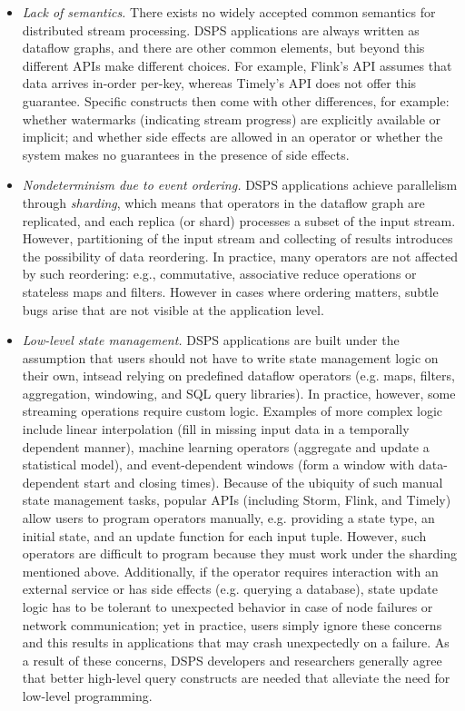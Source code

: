 \begin{itemize}
\item \emph{Lack of semantics.}
There exists no widely accepted common semantics for distributed stream processing.
DSPS applications are always written as dataflow graphs, and there are other common elements,
but beyond this different APIs make different choices.
For example, Flink's API
assumes that data arrives in-order per-key, whereas Timely's API does not offer this guarantee.
Specific constructs then come with other differences, for example: whether watermarks (indicating stream progress) are explicitly available or implicit;
and
whether side effects are allowed in an operator or whether the system makes no guarantees in the presence of side effects.

\item \emph{Nondeterminism due to event ordering.}
DSPS applications achieve parallelism through \emph{sharding}, which means that operators in the dataflow graph are replicated, and each replica (or shard) processes a subset of the input stream.
However, partitioning of the input stream and collecting of results introduces
the possibility of data reordering.
In practice, many operators are not affected by such reordering: e.g.,
commutative, associative reduce operations or stateless maps and filters.
However in cases where ordering matters,
subtle bugs arise that are not visible at the application level.

\item \emph{Low-level state management.}
DSPS applications are built under the assumption that users should not have to
write state management logic on their own, intsead relying on predefined
dataflow operators (e.g. maps, filters, aggregation, windowing, and SQL query libraries).
In practice, however, some streaming operations require custom logic.
Examples of more complex logic include linear interpolation (fill in missing input data in a temporally dependent manner),
machine learning operators (aggregate and update a statistical model),
and event-dependent windows (form a window with data-dependent start and closing times).
Because of the ubiquity of such manual state management tasks,
popular APIs (including Storm, Flink, and Timely) allow users to program
operators manually, e.g. providing a state type, an initial state, and an
update function for each input tuple.
However, such operators are difficult to program because they must work under
the sharding mentioned above.
Additionally, if the operator requires interaction with an external service or has side effects (e.g. querying a database), state update logic has to be tolerant to unexpected behavior in case of node failures or network communication; yet in practice, users simply ignore these concerns and this results in applications that may crash unexpectedly on a failure.
As a result of these concerns, DSPS developers and researchers generally agree
that better high-level query constructs are needed that alleviate the need for low-level programming.


\end{itemize}
